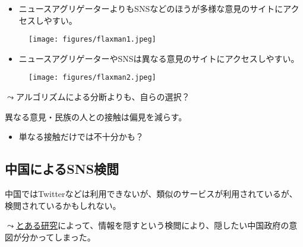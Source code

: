 \documentclass[
  xelatex,
  ja=standard]{bxjsarticle}
\providecommand{\tightlist}{%
  \setlength{\itemsep}{0pt}\setlength{\parskip}{0pt}}\usepackage{longtable,booktabs,array}
\begin{document}
\begin{itemize}
\tightlist
\item
  ニュースアグリゲーターよりもSNSなどのほうが多様な意見のサイトにアクセスしやすい。
\end{itemize}

\begin{figure}[htpb]

{\centering \texttt{[image: figures/flaxman1.jpeg]}

}

\caption{\citet{flaxman2016}}

\end{figure}

\begin{itemize}
\tightlist
\item
  ニュースアグリゲーターやSNSは異なる意見のサイトにアクセスしやすい。
\end{itemize}

\begin{figure}[htpb]

{\centering \texttt{[image: figures/flaxman2.jpeg]}

}

\caption{\citet{flaxman2016}}

\end{figure}

\(\leadsto\)アルゴリズムによる分断よりも、自らの選択？

異なる意見・民族の人との接触は偏見を減らす\citep{paluck2019}。

\begin{itemize}
\tightlist
\item
  単なる接触だけでは不十分かも？
\end{itemize}

\hypertarget{ux4e2dux56fdux306bux3088ux308bsnsux691cux95b2}{%
\subsection{中国によるSNS検閲}\label{ux4e2dux56fdux306bux3088ux308bsnsux691cux95b2}}

中国ではTwitterなどは利用できないが、類似のサービスが利用されているが、検閲されているかもしれない。

\(\leadsto\)\href{https://ipsj.ixsq.nii.ac.jp/ej/?action=pages_view_main\&active_action=repository_view_main_item_detail\&item_id=199708\&item_no=1\&page_id=13\&block_id=8}{とある研究}によって、情報を隠すという検閲により、隠したい中国政府の意図が分かってしまった。
\end{document}
